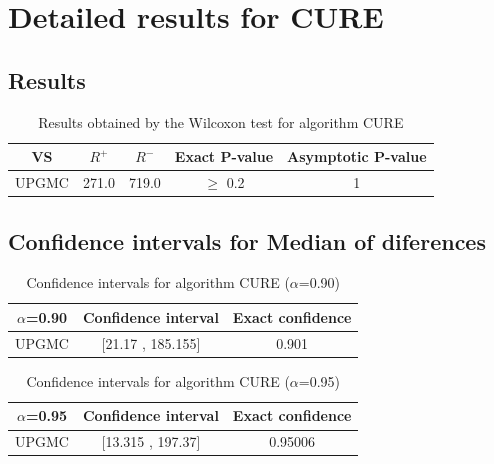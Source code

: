 \documentclass[a4paper,10pt]{article}
\begin{document}
 \clearpage 


\section{Detailed results for CURE}


\subsection{Results}

\begin{table}[!htp]
\centering\small
\begin{tabular}{
|c|c|c|c|c|}
\hline
 VS & $R^{+}$ & $R^{-}$ & Exact P-value & Asymptotic P-value \\ \hline 
UPGMC & 271.0 & 719.0 & $\geq$ 0.2 & 1\\ \hline 

\end{tabular}
\caption{Results obtained by the Wilcoxon test for algorithm CURE}
\end{table}

\subsection{Confidence intervals for Median of diferences}

\begin{table}[!htp]
\centering\small
\begin{tabular}{
|c|c|c|}
\hline
 $\alpha$=0.90 & Confidence interval & Exact confidence \\ \hline 
UPGMC & [21.17 , 185.155] & 0.901\\ \hline 

\end{tabular}
\caption{Confidence intervals for algorithm CURE ($\alpha$=0.90)}
\end{table}
\begin{table}[!htp]
\centering\small
\begin{tabular}{
|c|c|c|}
\hline
 $\alpha$=0.95 & Confidence interval & Exact confidence \\ \hline 
UPGMC & [13.315 , 197.37] & 0.95006\\ \hline 

\end{tabular}
\caption{Confidence intervals for algorithm CURE ($\alpha$=0.95)}
\end{table}

 \clearpage 
\end{document}
